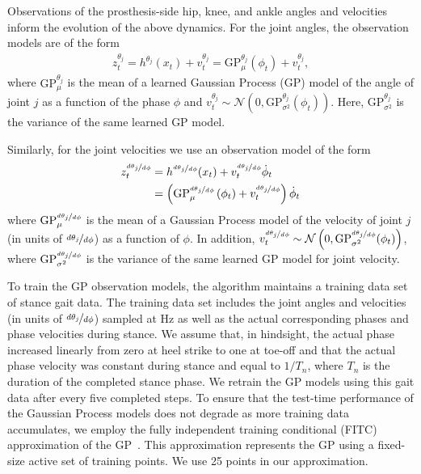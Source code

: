 Observations of the prosthesis-side hip, knee, and ankle angles and velocities
inform the evolution of the above dynamics. For the joint angles, the
observation models are of the form
\begin{align}
    z_t^{\theta_j} = h^{\theta_j}(x_t) + v_t^{\theta_j}
        = \mathrm{GP}_\mu^{\theta_j}\left(\phi_t \right) + v_t^{\theta_j},
\end{align}
where $\mathrm{GP}_\mu^{\theta_j}$ is the mean of a learned Gaussian Process
(GP) model of the angle of joint $j$ as a function of the phase $\phi$ and
$v_t^{\theta_j} \sim \mathcal{N} \left(0,
\mathrm{GP}_{\sigma^2}^{\theta_j}(\phi_t) \right)$. Here,
$\mathrm{GP}_{\sigma^2}^{\theta_j}$ is the variance of the same learned GP
model.

Similarly, for the joint velocities we use an observation model of the form
\begin{align}
    \begin{split}
        z_t^{\nicefrac{d \theta_j}{d \phi}}
            &= h^{\nicefrac{d \theta_j}{d \phi}}(x_t) 
                + v_t^{\nicefrac{d \theta_j}{d \phi}} \dot{\phi}_t \\
            &= \left( \mathrm{GP}_\mu^{\nicefrac{d \theta_j}{d \phi}} 
            \left(\phi_t \right) + v_t^{\nicefrac{d \theta_j}{d \phi}} \right) 
            \dot{\phi}_t
    \end{split}
\end{align}
where $\mathrm{GP}_\mu^{\nicefrac{d \theta_j}{d \phi}}$ is the mean of a
Gaussian Process model of the velocity of joint $j$ (in units of $\nicefrac{d
\theta_j}{d \phi}$) as a function of $\phi$. In addition, $v_t^{\nicefrac{d
\theta_j}{d \phi}} \sim \mathcal{N} \left(0, \mathrm{GP}_{\sigma^2}^{\nicefrac{d
\theta_j}{d \phi}}(\phi_t) \right)$, where $\mathrm{GP}_{\sigma^2}^{\nicefrac{d
\theta_j}{d \phi}}$ is the variance of the same learned GP model for joint
velocity.

To train the GP observation models, the algorithm maintains a training data set
of stance gait data. The training data set includes the joint angles and
velocities (in units of $\nicefrac{d \theta_j}{d\phi}$) sampled at
\unit[100]{Hz} as well as the actual corresponding phases and phase velocities
during stance. We assume that, in hindsight, the actual phase increased linearly
from zero at heel strike to one at toe-off and that the actual phase velocity
was constant during stance and equal to $1/T_n$, where $T_n$ is the duration of
the completed stance phase. We retrain the GP models using this gait data after
every five completed steps. To ensure that the test-time performance of the
Gaussian Process models does not degrade as more training data accumulates, we
employ the fully independent training conditional (FITC) approximation of the
GP~\citep{snelson2007local}. This approximation represents the GP using a
fixed-size active set of training points. We use 25 points in our approximation.

